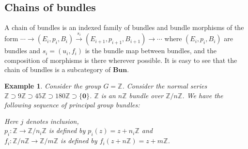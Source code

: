 \documentclass{amsart}
\theoremstyle{plain}
\newtheorem{exam}{Example}
\begin{document}
\subsection{Chains of bundles}
A chain of bundles  is an indexed family of bundles and bundle morphisms of the form $\cdots \rightarrow (E_i, p_i, B_i) \stackrel{s_i}{\rightarrow} (E_{i+1}, p_{i+1} ,B_{i+1})  \rightarrow \cdots$
where $(E_i, p_i, B_i)$ are bundles and $s_i = (u_i, f_i)$ is the bundle map between bundles, and the composition of morphisms is there wherever possible. It is easy to see that the chain of bundles is a subcategory of $\textbf{Bun}$.
\begin{exam}
	Consider the group $G =\mathbb{Z}$. Consider the normal series $\mathbb{Z} \supset 9\mathbb{Z} \supset 45 \mathbb{Z} \supset 180\mathbb{Z} \supset \{\textbf{0}\}$.
	$\mathbb{Z}$ is an $n\mathbb{Z}$ bundle over $\mathbb{Z}/n\mathbb{Z}$.	We have the following sequence of principal group bundles: 
	\begin{center} \small
	\end{center}
	Here $j$ denotes inclusion,\\ $p_i: \mathbb{Z} \rightarrow \mathbb{Z}/n_i\mathbb{Z} $ is defined by $p_i(z) = z + n_i \mathbb{Z} $ and\\ $f_i: \mathbb{Z}/n\mathbb{Z} \rightarrow \mathbb{Z}/m\mathbb{Z} $ is defined by $f_i(z+ n \mathbb{Z}) = z+ m \mathbb{Z}$.
\end{exam}
\end{document}
